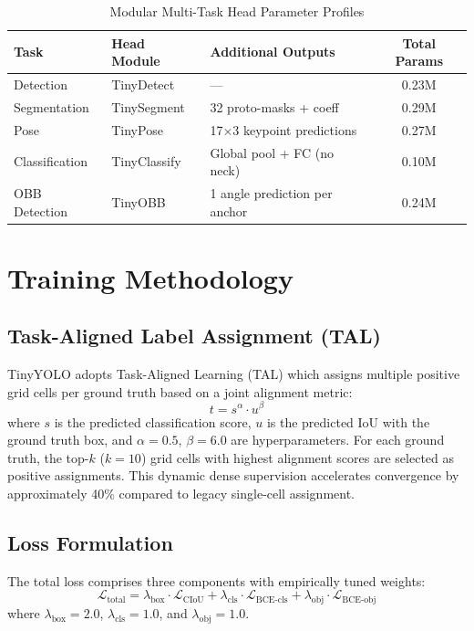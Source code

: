 \documentclass[conference]{IEEEtran}
\begin{document}
\begin{table}[h]
\centering
\caption{Modular Multi-Task Head Parameter Profiles}
\label{tab:multi_task_heads}
\setlength{\tabcolsep}{4pt}
\begin{tabular}{lllc}
\toprule
Task & Head Module & Additional Outputs & Total Params \\
\midrule
Detection & TinyDetect & --- & 0.23M \\
Segmentation & TinySegment & 32 proto-masks + coeff & 0.29M \\
Pose & TinyPose & 17$\times$3 keypoint predictions & 0.27M \\
Classification & TinyClassify & Global pool + FC (no neck) & 0.10M \\
OBB Detection & TinyOBB & 1 angle prediction per anchor & 0.24M \\
\bottomrule
\end{tabular}
\end{table}

\section{Training Methodology}

\subsection{Task-Aligned Label Assignment (TAL)}
TinyYOLO adopts Task-Aligned Learning (TAL) \cite{feng2021tood} which assigns multiple positive grid cells per ground truth based on a joint alignment metric:
\begin{equation}
t = s^\alpha \cdot u^\beta
\end{equation}
where $s$ is the predicted classification score, $u$ is the predicted IoU with the ground truth box, and $\alpha = 0.5$, $\beta = 6.0$ are hyperparameters. For each ground truth, the top-$k$ ($k = 10$) grid cells with highest alignment scores are selected as positive assignments. This dynamic dense supervision accelerates convergence by approximately 40\% compared to legacy single-cell assignment.

\subsection{Loss Formulation}
The total loss comprises three components with empirically tuned weights:
\begin{equation}
\mathcal{L}_{\text{total}} = \lambda_{\text{box}} \cdot \mathcal{L}_{\text{CIoU}} + \lambda_{\text{cls}} \cdot \mathcal{L}_{\text{BCE-cls}} + \lambda_{\text{obj}} \cdot \mathcal{L}_{\text{BCE-obj}}
\end{equation}
where $\lambda_{\text{box}} = 2.0$, $\lambda_{\text{cls}} = 1.0$, and $\lambda_{\text{obj}} = 1.0$.
\end{document}
